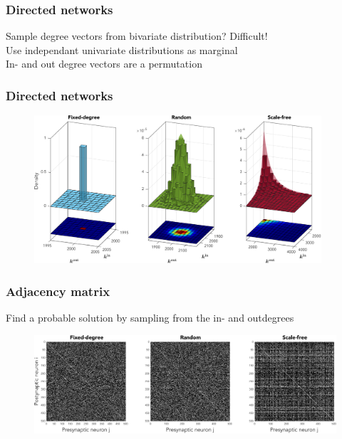 \begin{frame}
\frametitle{Directed networks} 
Sample degree vectors from bivariate distribution? Difficult!\\
\tabitem Use independant univariate distributions as marginal \\
\tabitem In- and out degree vectors are a permutation
\end{frame}

\begin{frame}
\frametitle{Directed networks} 
\begin{figure}[ht]
\centering
\includegraphics[width = 0.95\textwidth]{../Figures/Distributions/2D.pdf}
\label{fig:2Ddistributions}
\end{figure}
\end{frame}

\begin{frame}
\frametitle{Adjacency matrix} 
Find a probable solution by sampling from the in- and outdegrees
\begin{figure}[H]
\centering
\includegraphics[width = \textwidth]{../Figures/Adjacency_matrices.pdf}
\label{fig:adjacencymatrices}
\end{figure}
\end{frame}

